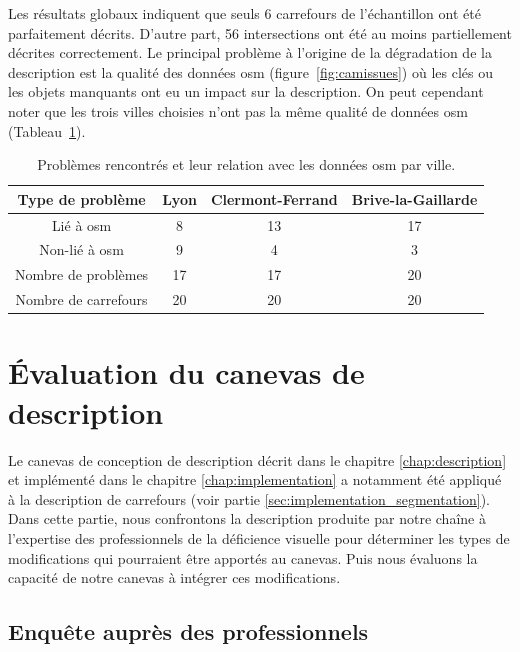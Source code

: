 \newpar{}

Les résultats globaux indiquent que seuls 6 carrefours de l'échantillon ont été parfaitement décrits. D'autre part, 56 intersections ont été au moins partiellement décrites correctement. Le principal problème à l'origine de la dégradation de la description est la qualité des données \gls{osm} (figure~\ref{fig:camissues}) où les clés ou les objets manquants ont eu un impact sur la description. On peut cependant noter que les trois villes choisies n'ont pas la même qualité de données \gls{osm} (Tableau~\ref{tab:osmqualityissues}).

\begin{table}[ht]
    \begin{center}
        \footnotesize
        \begin{tabular}{c | c | c | c }
            Type de problème & Lyon & Clermont-Ferrand & Brive-la-Gaillarde\\
            \hline
            Lié à \gls{osm} & 8  & 13 & 17 \\
            Non-lié à \gls{osm} & 9 & 4 & 3 \\
            \hline
            Nombre de problèmes & 17 & 17 & 20 \\
            Nombre de carrefours & 20 & 20 & 20
        \end{tabular}
        \caption[Relation entre les problèmes rencontrés et les données OpenStreetMap]{Problèmes rencontrés et leur relation avec les données \gls{osm} par ville.}
        \label{tab:osmqualityissues}
    \end{center}
\end{table}

\section{Évaluation du canevas de description}

Le canevas de conception de description décrit dans le chapitre \ref{chap:description} et implémenté dans le chapitre \ref{chap:implementation} a notamment été appliqué à la description de carrefours (voir partie \ref{sec:implementation_segmentation}). Dans cette partie, nous confrontons la description produite par notre chaîne à l'expertise des professionnels de la déficience visuelle pour déterminer les types de modifications qui pourraient être apportés au canevas. Puis nous évaluons la capacité de notre canevas à intégrer ces modifications.

\subsection{Enquête auprès des professionnels}

